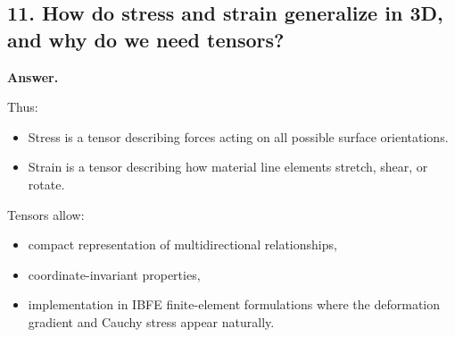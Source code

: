 \documentclass[12pt]{article}
\begin{document}
\subsection*{11. How do stress and strain generalize in 3D, and why do we need tensors?}

\textbf{Answer.}


Thus:
\begin{itemize}
    \item Stress is a tensor describing forces acting on all possible surface orientations.
    \item Strain is a tensor describing how material line elements stretch, shear, or rotate.
\end{itemize}

Tensors allow:
\begin{itemize}
    \item compact representation of multidirectional relationships,
    \item coordinate-invariant properties,
    \item implementation in IBFE finite-element formulations where the deformation gradient and Cauchy stress appear naturally.
\end{itemize}

\end{document}
